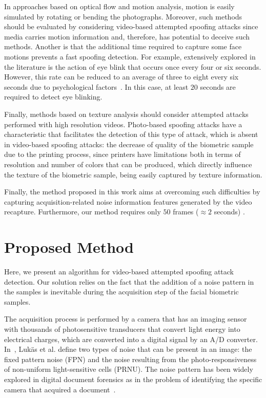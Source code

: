 \documentclass[journal]{IEEEtran}
\providecommand{\rv}[1]{{\protect\color{black}{#1}}}
\providecommand{\bmark}[1]{{\protect\color{black}{#1}}}
\begin{document}
In approaches based on optical flow and motion analysis, motion is easily simulated by rotating or bending the photographs. Moreover, such methods should be evaluated by considering video-based attempted spoofing attacks since \rv{these} media carries motion information and, therefore, has potential to deceive such methods. Another \rv{disadvantage of approaches based on motion analysis} is that the additional time required to capture some face motions prevents a fast spoofing detection. For example, \rv{a type of motion analyses} extensively explored in the literature is the action of eye blink that occurs once every four or six seconds. However, this rate can be reduced to an average of three to eight every six seconds due to psychological factors~\cite{Li:ICMLC:2008}. In this case, at least $20$ seconds are required to detect eye blinking.

Finally, methods based on texture analysis should consider attempted attacks performed with high resolution videos. Photo-based spoofing attacks have a characteristic that facilitates the detection of this type of attack, which is absent in video-based spoofing attacks: the decrease of quality of the biometric sample due to the printing process, since printers have limitations both in terms of resolution and number of colors that can be produced, which directly influence the texture of the biometric sample, being easily captured by texture information.

Finally, the method proposed in this work aims at overcoming such difficulties by capturing acquisition-related noise information features generated by the video recapture. \bmark{As the noise signal is independent of the image signal, our method explores this fact by isolating the noise, so it tends to be less dependent of the video content.} Furthermore, our method requires only $50$ frames ($\approx 2$ seconds) \bmark{for detecting an attempted attack}.

\section{Proposed Method}
\label{sec:ProposedMethod}

Here, we present an algorithm for video-based attempted spoofing attack detection. Our solution relies on the fact that the addition of a noise pattern in the samples is inevitable during the acquisition step of the facial biometric samples.

The acquisition process is performed by a camera that has an imaging sensor with thousands of photosensitive transducers that convert light energy into electrical charges, which are converted into a digital signal by an A/D converter. In~\cite{Lukas:TIFS:2006}, Luk\"{a}s et al. define two types of noise that can be present  in an image: the fixed pattern noise (FPN) and the noise resulting from the photo-responsiveness of non-uniform light-sensitive cells (PRNU). The noise pattern has been widely explored in digital document forensics as in the problem of identifying the specific camera that acquired a document~\cite{Lukas:TIFS:2006,Rocha:CSUR:2011}.
\end{document}
